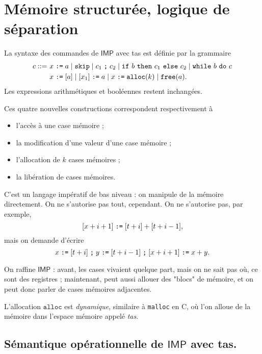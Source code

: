 \documentclass[../main]{subfiles}
\begin{document}
  \chapter{Mémoire structurée, logique de séparation}
  \minitoc

  La syntaxe des commandes de $\mathsf{IMP}$ avec tas est définie par la grammaire 
  \begin{align*}
    c ::= \ &x \mathrel{\texttt{:=}} a  \mid \texttt{skip}  \mid c_1 \mathrel{\texttt{;}} c_2  \mid \texttt{if}\ b\ \texttt{then}\ c_1\ \texttt{else}\ c_2  \mid \texttt{while}\ b\ \texttt{do}\ c\\
          &x \mathrel{\texttt{:=}} [a]  \mid [x_1] \mathrel{\texttt{:=}} a  \mid x \mathrel{\texttt{:=}} \texttt{alloc}(k)  \mid \texttt{free}(a).
  \end{align*}
  Les expressions arithmétiques et booléennes restent inchangées.

  Ces quatre nouvelles constructions correspondent respectivement à 
  \begin{itemize}
    \item l'accès à une case mémoire ;
    \item la modification d'une valeur d'une case mémoire ;
    \item l'allocation de $k$ cases mémoires ;
    \item la libération de cases mémoires.
  \end{itemize}

  \begin{rmk}
    C'est un langage impératif de bas niveau : on manipule de la mémoire directement.
    On ne s'autorise pas tout, cependant. On ne s'autorise pas, par exemple, \[
      [x + i + 1] \mathrel{\texttt{:=}} [t + i] + [t + i - 1]
    ,\] mais on demande d'écrire \[
      x \mathrel{\texttt{:=}} [t+i]\mathrel{\texttt{;}} y \mathrel{\texttt{:=}} [t + i - 1] \mathrel{\texttt{;}} [x + i + 1] \mathrel{\texttt{:=}} x + y
    .\]
  \end{rmk}

  On raffine $\mathsf{IMP}$ : avant, les cases vivaient quelque part, mais on ne sait pas où, ce sont des registres ; maintenant, peut aussi allouer des "blocs" de mémoire, et on peut donc parler de cases mémoires adjacentes.

  L'allocation $\mathtt{alloc}$ est \textit{dynamique}, similaire à \texttt{malloc} en C, où l'on alloue de la mémoire dans l'espace mémoire appelé \textit{tas}.

  \section{Sémantique opérationnelle de $\mathsf{IMP}$ avec tas.}
\end{document}
